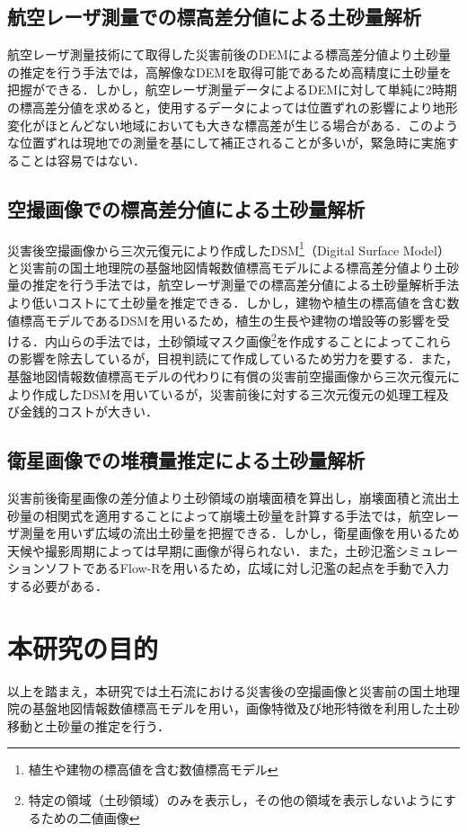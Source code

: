     \subsection*{航空レーザ測量での標高差分値による土砂量解析}
      航空レーザ測量技術にて取得した災害前後のDEMによる標高差分値より土砂量の推定を行う手法\cite{土砂量解析1, 土砂量解析2}では，高解像なDEMを取得可能であるため高精度に土砂量を把握ができる．しかし，航空レーザ測量データによるDEMに対して単純に2時期の標高差分値を求めると，使用するデータによっては位置ずれの影響により地形変化がほとんどない地域においても大きな標高差が生じる場合がある．このような位置ずれは現地での測量を基にして補正されることが多いが，緊急時に実施することは容易ではない．


    \subsection*{空撮画像での標高差分値による土砂量解析}
      災害後空撮画像から三次元復元により作成したDSM\footnote{植生や建物の標高値を含む数値標高モデル}（Digital Surface Model）と災害前の国土地理院の基盤地図情報数値標高モデル\cite{基盤地図情報}による標高差分値より土砂量の推定を行う手法\cite{土砂量解析3}では，航空レーザ測量での標高差分値による土砂量解析手法より低いコストにて土砂量を推定できる．しかし，建物や植生の標高値を含む数値標高モデルであるDSMを用いるため，植生の生長や建物の増設等の影響を受ける．内山らの手法\cite{土砂量解析4}では，土砂領域マスク画像\footnote{特定の領域（土砂領域）のみを表示し，その他の領域を表示しないようにするための二値画像}を作成することによってこれらの影響を除去しているが，目視判読にて作成しているため労力を要する．また，基盤地図情報数値標高モデルの代わりに有償の災害前空撮画像から三次元復元により作成したDSMを用いているが，災害前後に対する三次元復元の処理工程及び金銭的コストが大きい．


    \subsection*{衛星画像での堆積量推定による土砂量解析}
      災害前後衛星画像の差分値より土砂領域の崩壊面積を算出し，崩壊面積と流出土砂量の相関式を適用することによって崩壊土砂量を計算する手法\cite{土砂量解析5}では，航空レーザ測量を用いず広域の流出土砂量を把握できる．しかし，衛星画像を用いるため天候や撮影周期によっては早期に画像が得られない．また，土砂氾濫シミュレーションソフトであるFlow-R\cite{Flow-R}を用いるため，広域に対し氾濫の起点を手動で入力する必要がある．



  \section{本研究の目的}
    以上を踏まえ，本研究では土石流における災害後の空撮画像と災害前の国土地理院の基盤地図情報数値標高モデルを用い，画像特徴及び地形特徴を利用した土砂移動と土砂量の推定を行う．
    
